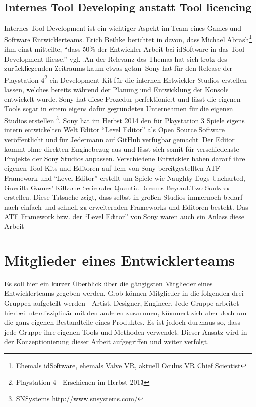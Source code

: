 \documentclass[pagesize, paper=a4, fontsize=12pt,titlepage=true, headings=small, headnosepline, abstractoff, liststotoc, nochapterprefix, plainheadsepline, twoside]{scrreprt}
\begin{document}
\subsection{Internes Tool Developing anstatt Tool licencing} %
Internes Tool Development ist ein wichtiger Aspekt im Team eines Games und Software Entwicklerteams. Erich Bethke berichtet  in davon, dass Michael Abrash\footnote{Ehemals idSoftware, ehemals Valve VR, aktuell Oculus VR Chief Scientist} ihm einst mitteilte, “dass 50\% der Entwickler Arbeit bei idSoftware in das Tool Development fliesse.” vgl. .An der Relevanz des Themas hat sich trotz des zurückliegenden Zeitraums kaum etwas getan. Sony hat für den Release der Playstation 4\footnote{Playstation 4 - Erschienen im Herbst 2013} ein Development Kit  für die internen Entwickler Studios  erstellen lassen, welches bereits während der Planung und Entwicklung der Konsole entwickelt wurde. Sony hat diese Prozedur perfektioniert und lässt die eigenen Tools sogar in einem eigens dafür gegründeten Unternehmen für die eigenen Studios erstellen \footnote{SNSystems \url{http://www.snsystems.com/}}. Sony hat im Herbst 2014 den für Playstation 3 Spiele eigens intern entwickelten Welt Editor “Level Editor” als Open Source Software veröffentlicht und für Jedermann auf GitHub verfügbar gemacht. Der Editor kommt ohne direkten Enginebezug aus und lässt sich somit für verschiedenste Projekte der Sony Studios anpassen. Verschiedene Entwickler haben darauf ihre eigenen Tool Kits und Editoren auf dem von Sony bereitgestellten ATF Framework und “Level Editor” erstellt um Spiele wie Naughty Dogs Uncharted, Guerilla Games’ Killzone Serie oder Quantic Dreams Beyond:Two Souls zu erstellen. Diese Tatsache zeigt, dass selbst in großen Studios immernoch bedarf nach einfach und schnell zu erweiternden Frameworks und Editoren besteht. Das ATF Framework bzw. der “Level Editor” von Sony waren auch ein Anlass diese Arbeit 

\section{Mitglieder eines Entwicklerteams}
Es soll hier ein kurzer Überblick über die gängigsten Mitglieder eines Entwicklerteams gegeben werden. Grob können Mitglieder in die folgenden drei Gruppen aufgeteilt werden - Artist, Designer, Engineer. Jede Gruppe arbeitet hierbei interdisziplinär mit den anderen zusammen, kümmert sich aber doch um die ganz eigenen Bestandteile eines Produktes. Es ist jedoch durchaus so, dass jede Gruppe ihre eigenen Tools und Methoden verwendet. Dieser Ansatz wird in der Konzeptionierung dieser Arbeit aufgegriffen und weiter verfolgt.
\end{document}
